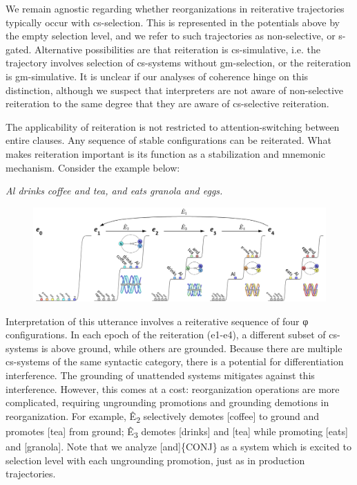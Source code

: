   We remain agnostic regarding whether reorganizations in reiterative trajectories typically occur with cs-selection. This is represented in the potentials above by the empty selection level, and we refer to such trajectories as non-selective, or s-gated. Alternative possibilities are that reiteration is cs-simulative, i.e. the trajectory involves selection of cs-systems without gm-selection, or the reiteration is gm-simulative. It is unclear if our analyses of coherence hinge on this distinction, although we suspect that interpreters are not aware of non-selective reiteration to the same degree that they are aware of cs-selective reiteration.  

  The applicability of reiteration is not restricted to attention-switching between entire clauses. Any sequence of stable configurations can be reiterated. What makes reiteration important is its function as a stabilization and mnemonic mechanism. Consider the example below:  

\textit{Al drinks coffee and tea, and eats granola and eggs.}

  
\begin{figure}
\includegraphics[width=\textwidth]{figures/Tilsen-img123.png}
\caption{\missingcaption}
\label{fig:}
\end{figure}
 

  Interpretation of this utterance involves a reiterative sequence of four φ configurations. In each epoch of the reiteration (e1-e4), a different subset of cs-systems is above ground, while others are grounded. Because there are multiple cs-systems of the same syntactic category, there is a potential for differentiation interference. The grounding of unattended systems mitigates against this interference. However, this comes at a cost: reorganization operations are more complicated, requiring ungrounding promotions and grounding demotions in reorganization. For example, Ê\textsubscript{2} selectively demotes [coffee] to ground and promotes [tea] from ground; Ê\textsubscript{3} demotes [drinks] and [tea] while promoting [eats] and [granola]. Note that we analyze [and]\{CONJ\} as a system which is excited to selection level with each ungrounding promotion, just as in production trajectories.

